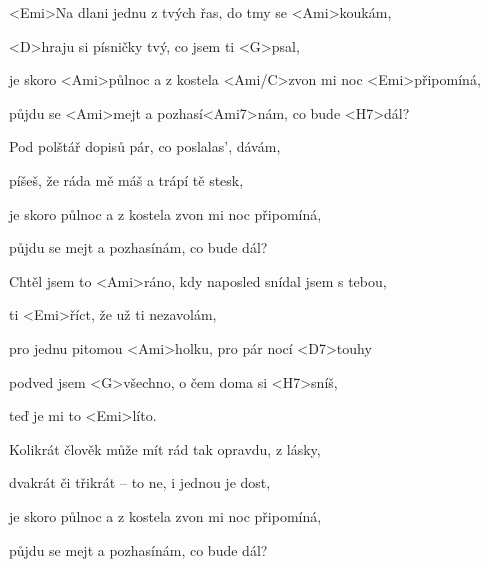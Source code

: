 

\zs
<Emi>Na dlani jednu z tvých řas, do tmy se <Ami>koukám,

<D>hraju si písničky tvý, co jsem ti <G>psal,

je skoro <Ami>půlnoc a z kostela <Ami/C>zvon mi noc <Emi>připomíná,

půjdu se <Ami>mejt a pozhasí<Ami7>nám, co bude <H7>dál?
\ks

\zs
Pod polštář dopisů pár, co poslalas', dávám,

píšeš, že ráda mě máš a trápí tě stesk,

je skoro půlnoc a z kostela zvon mi noc připomíná,

půjdu se mejt a pozhasínám, co bude dál?
\ks

\zr
Chtěl jsem to <Ami>ráno, kdy naposled snídal jsem s tebou,

ti <Emi>říct, že už ti nezavolám,

pro jednu pitomou <Ami>holku, pro pár nocí <D7>touhy

podved jsem <G>všechno, o čem doma si <H7>sníš,

teď je mi to <Emi>líto.
\kr

\zs
Kolikrát člověk může mít rád tak opravdu, z lásky,

dvakrát či třikrát -- to ne, i jednou je dost,

je skoro půlnoc a z kostela zvon mi noc připomíná,

půjdu se mejt a pozhasínám, co bude dál?
\ks


\zr \kr

\kp
